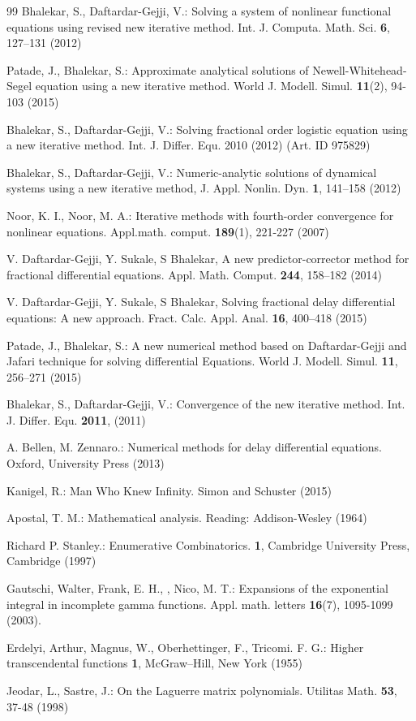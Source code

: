 \documentclass[12pt]{article}
\numberwithin{equation}{section}
\begin{document}
\begin{thebibliography}{99}
 Bhalekar, S., Daftardar-Gejji, V.: Solving a system of nonlinear functional equations using revised new iterative method. Int. J. Computa. Math. Sci. \textbf{6}, 127--131 (2012)

 Patade, J., Bhalekar, S.: Approximate analytical solutions of Newell-Whitehead-Segel equation using a new iterative method.  World J. Modell. Simul.  \textbf{11}(2),  94-103 (2015)

 Bhalekar, S., Daftardar-Gejji, V.:  Solving fractional order logistic equation using a new iterative method. Int. J. Differ. Equ. 2010 (2012) (Art. ID 975829)

 Bhalekar, S., Daftardar-Gejji, V.:  Numeric-analytic solutions of dynamical systems using a new iterative method, J. Appl. Nonlin. Dyn. \textbf{1}, 141--158  (2012)

 Noor, K. I., Noor, M. A.: Iterative methods with fourth-order convergence for nonlinear equations. Appl.math. comput. \textbf{189}(1), 221-227 (2007)

 V. Daftardar-Gejji, Y. Sukale, S Bhalekar, A new predictor-corrector method for fractional differential equations. Appl. Math. Comput. \textbf{244}, 158--182 (2014)

   V. Daftardar-Gejji, Y. Sukale, S Bhalekar, Solving fractional delay differential equations: A new approach. Fract. Calc. Appl. Anal. \textbf{16}, 400--418 (2015)

 Patade, J., Bhalekar, S.: A new numerical method based on Daftardar-Gejji and Jafari technique for solving differential Equations. World J. Modell. Simul. \textbf{11},  256--271  (2015)

 Bhalekar, S., Daftardar-Gejji, V.: Convergence of the new iterative method. Int. J. Differ. Equ. \textbf{2011}, (2011)

 A. Bellen, M. Zennaro.:  Numerical methods for delay differential equations. Oxford, University Press (2013)

 Kanigel, R.:  Man Who Knew Infinity. Simon and Schuster (2015)

  Apostal, T. M.:  Mathematical analysis. Reading: Addison-Wesley (1964)


 Richard P. Stanley.: Enumerative Combinatorics. \textbf{1}, Cambridge University Press, Cambridge (1997) 


 Gautschi, Walter, Frank, E. H., , Nico, M. T.: Expansions of the exponential integral in incomplete gamma functions. Appl. math. letters \textbf{16}(7), 1095-1099 (2003).

 Erdelyi, Arthur, Magnus, W., Oberhettinger, F., Tricomi.  F. G.: Higher transcendental functions \textbf{1}, McGraw–Hill, New York (1955) 

 Jeodar, L., Sastre, J.: On the Laguerre matrix polynomials. Utilitas Math. \textbf{53}, 37-48 (1998)



\end{thebibliography}
\end{document}
